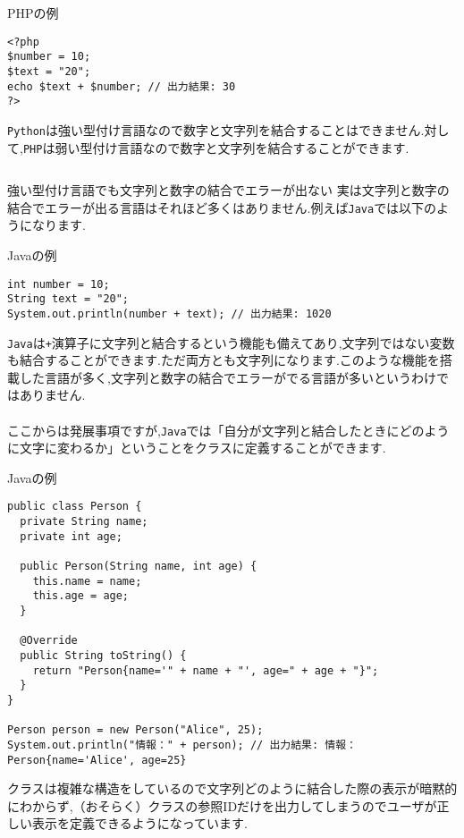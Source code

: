 \documentclass[a4paper]{ltjsreport}
\newcommand{\terlogy}[2][|]{\colorbox{terlogy}{\texttt{\lstinline#1#2#1}}}
\begin{document}
\begin{zennwt}{PHPの例}
  \begin{lstlisting}[language=myphp]
<?php
$number = 10;
$text = "20";
echo $text + $number; // 出力結果: 30
?>
\end{lstlisting}
\end{zennwt}

\terlogy{Python}は強い型付け言語なので数字と文字列を結合することはできません.対して,\terlogy{PHP}は弱い型付け言語なので数字と文字列を結合することができます.

\begin{column}{強い型付け言語でも文字列と数字の結合でエラーが出ない}
  実は文字列と数字の結合でエラーが出る言語はそれほど多くはありません.例えば\terlogy{Java}では以下のようになります.
  \begin{zennwt}{Javaの例}
    \begin{lstlisting}[language=myjava]
int number = 10;
String text = "20";
System.out.println(number + text); // 出力結果: 1020
\end{lstlisting}
  \end{zennwt}
  \terlogy{Java}は\terlogy{+}演算子に文字列と結合するという機能も備えてあり,文字列ではない変数も結合することができます.ただ両方とも文字列になります.このような機能を搭載した言語が多く,文字列と数字の結合でエラーがでる言語が多いというわけではありません.
  \\\\
  ここからは発展事項ですが,\terlogy{Java}では「自分が文字列と結合したときにどのように文字に変わるか」ということをクラスに定義することができます.

  \begin{zennwt}{Javaの例}
    \begin{lstlisting}[language=myjava]
public class Person {
  private String name;
  private int age;

  public Person(String name, int age) {
    this.name = name;
    this.age = age;
  }

  @Override
  public String toString() {
    return "Person{name='" + name + "', age=" + age + "}";
  }
}

Person person = new Person("Alice", 25);
System.out.println("情報：" + person); // 出力結果: 情報：Person{name='Alice', age=25}
\end{lstlisting}
  \end{zennwt}

  クラスは複雑な構造をしているので文字列どのように結合した際の表示が暗黙的にわからず,（おそらく）クラスの参照IDだけを出力してしまうのでユーザが正しい表示を定義できるようになっています.

\end{column}
\end{document}
